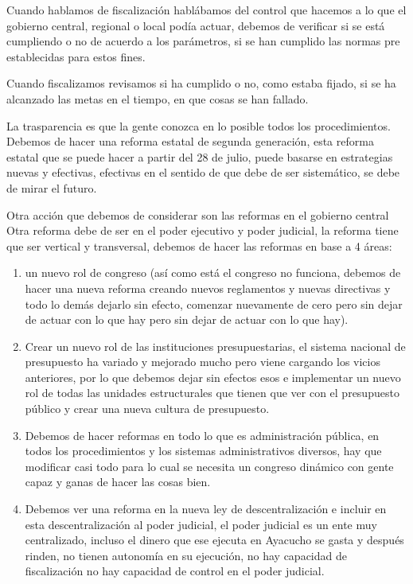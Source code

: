 \documentclass[
  jou,
  floatsintext,
  longtable,
  a4paper,
  nolmodern,
  notxfonts,
  notimes,
  12pt,
  colorlinks=true,linkcolor=blue,citecolor=blue,urlcolor=blue]{apa7}
\begin{document}
Cuando hablamos de fiscalización hablábamos del control que hacemos a lo
que el gobierno central, regional o local podía actuar, debemos de
verificar si se está cumpliendo o no de acuerdo a los parámetros, si se
han cumplido las normas pre establecidas para estos fines.

Cuando fiscalizamos revisamos si ha cumplido o no, como estaba fijado,
si se ha alcanzado las metas en el tiempo, en que cosas se han fallado.

La trasparencia es que la gente conozca en lo posible todos los
procedimientos. Debemos de hacer una reforma estatal de segunda
generación, esta reforma estatal que se puede hacer a partir del 28 de
julio, puede basarse en estrategias nuevas y efectivas, efectivas en el
sentido de que debe de ser sistemático, se debe de mirar el futuro.

Otra acción que debemos de considerar son las reformas en el gobierno
central Otra reforma debe de ser en el poder ejecutivo y poder judicial,
la reforma tiene que ser vertical y transversal, debemos de hacer las
reformas en base a 4 áreas:

\begin{enumerate}
\def\labelenumi{\arabic{enumi}.}
\item
  un nuevo rol de congreso (así como está el congreso no funciona,
  debemos de hacer una nueva reforma creando nuevos reglamentos y nuevas
  directivas y todo lo demás dejarlo sin efecto, comenzar nuevamente de
  cero pero sin dejar de actuar con lo que hay pero sin dejar de actuar
  con lo que hay).
\item
  Crear un nuevo rol de las instituciones presupuestarias, el sistema
  nacional de presupuesto ha variado y mejorado mucho pero viene
  cargando los vicios anteriores, por lo que debemos dejar sin efectos
  esos e implementar un nuevo rol de todas las unidades estructurales
  que tienen que ver con el presupuesto público y crear una nueva
  cultura de presupuesto.
\item
  Debemos de hacer reformas en todo lo que es administración pública, en
  todos los procedimientos y los sistemas administrativos diversos, hay
  que modificar casi todo para lo cual se necesita un congreso dinámico
  con gente capaz y ganas de hacer las cosas bien.
\item
  Debemos ver una reforma en la nueva ley de descentralización e incluir
  en esta descentralización al poder judicial, el poder judicial es un
  ente muy centralizado, incluso el dinero que ese ejecuta en Ayacucho
  se gasta y después rinden, no tienen autonomía en su ejecución, no hay
  capacidad de fiscalización no hay capacidad de control en el poder
  judicial.
\end{enumerate}
\end{document}
